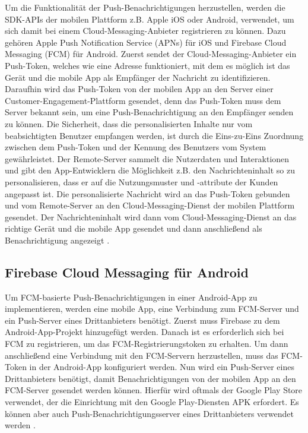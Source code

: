 \documentclass[sigconf]{acmart}
\begin{document}
Um die Funktionalität der Push-Benachrichtigungen herzustellen, 
werden die SDK-APIs der mobilen Plattform z.B. Apple iOS oder Android, 
verwendet, um sich damit bei einem Cloud-Messaging-Anbieter 
registrieren zu können. Dazu gehören Apple Push Notification Service 
(APNs) für iOS und Firebase Cloud Messaging (FCM) für Android.
Zuerst sendet der Cloud-Messaging-Anbieter ein Push-Token, welches wie 
eine Adresse funktioniert, mit dem es möglich ist das Gerät und die 
mobile App als Empfänger der Nachricht zu identifizieren.
Daraufhin wird das Push-Token von der mobilen App an den Server einer 
Customer-Engagement-Plattform gesendet, denn das Push-Token muss dem 
Server bekannt sein, um eine Push-Benachrichtigung an den Empfänger 
senden zu können.
Die Sicherheit, dass die personalisierten Inhalte nur vom 
beabsichtigten Benutzer empfangen werden, ist durch die Eins-zu-Eins 
Zuordnung zwischen dem Push-Token und der Kennung des Benutzers vom 
System gewährleistet.
Der Remote-Server sammelt die Nutzerdaten und Interaktionen und gibt 
den App-Entwicklern die Möglichkeit z.B. den Nachrichteninhalt so zu 
personalisieren, dass er auf die Nutzungsmuster und -attribute der 
Kunden angepasst ist.
Die personalisierte Nachricht wird an das Push-Token gebunden und 
vom Remote-Server an den Cloud-Messaging-Dienst der mobilen 
Plattform gesendet.
Der Nachrichteninhalt wird dann vom Cloud-Messaging-Dienst an das 
richtige Gerät und die mobile App gesendet und dann anschließend als 
Benachrichtigung angezeigt \cite{agarwal}.

\subsection{Firebase Cloud Messaging für Android}

Um FCM-basierte Push-Benachrichtigungen in einer 
Android-App zu implementieren, werden eine mobile App, eine Verbindung 
zum FCM-Server und ein Push-Server eines Drittanbieters benötigt.
Zuerst muss Firebase zu dem Android-App-Projekt hinzugefügt werden. 
Danach ist es erforderlich sich bei FCM zu registrieren, um das 
FCM-Registrierungstoken zu erhalten. Um dann anschließend eine 
Verbindung mit den FCM-Servern herzustellen, muss das FCM-Token 
in der Android-App konfiguriert werden. Nun wird ein Push-Server 
eines Drittanbieters benötigt, damit Benachrichtigungen von der 
mobilen App an den FCM-Server gesendet werden können.
Hierfür wird oftmals der Google Play Store verwendet, der die 
Einrichtung mit den Google Play-Diensten APK erfordert. Es können 
aber auch Push-Benachrichtigungsserver eines Drittanbieters verwendet 
werden \cite{firebase}.
\end{document}
